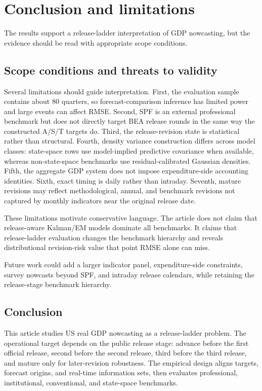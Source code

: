 \documentclass[12pt]{article}
\begin{document}
\section{Conclusion and limitations}
\label{sec:conclusion_limitations}

The results support a release-ladder interpretation of GDP nowcasting, but the evidence should be read with appropriate scope conditions.

\subsection{Scope conditions and threats to validity}
\label{sec:limitations}

Several limitations should guide interpretation. First, the evaluation sample contains about 80 quarters, so forecast-comparison inference has limited power and large events can affect RMSE. Second, SPF is an external professional benchmark but does not directly target BEA release rounds in the same way the constructed A/S/T targets do. Third, the release-revision state is statistical rather than structural. Fourth, density variance construction differs across model classes: state-space rows use model-implied predictive covariance when available, whereas non-state-space benchmarks use residual-calibrated Gaussian densities. Fifth, the aggregate GDP system does not impose expenditure-side accounting identities. Sixth, exact timing is daily rather than intraday. Seventh, mature revisions may reflect methodological, annual, and benchmark revisions not captured by monthly indicators near the original release date.

These limitations motivate conservative language. The article does not claim that release-aware Kalman/EM models dominate all benchmarks. It claims that release-ladder evaluation changes the benchmark hierarchy and reveals distributional revision-risk value that point RMSE alone can miss.

Future work could add a larger indicator panel, expenditure-side constraints, survey nowcasts beyond SPF, and intraday release calendars, while retaining the release-stage benchmark hierarchy.


\subsection{Conclusion}
\label{sec:conclusion}

This article studies US real GDP nowcasting as a release-ladder problem. The operational target depends on the public release stage: advance before the first official release, second before the second release, third before the third release, and mature only for later-revision robustness. The empirical design aligns targets, forecast origins, and real-time information sets, then evaluates professional, institutional, conventional, and state-space benchmarks.
\end{document}
